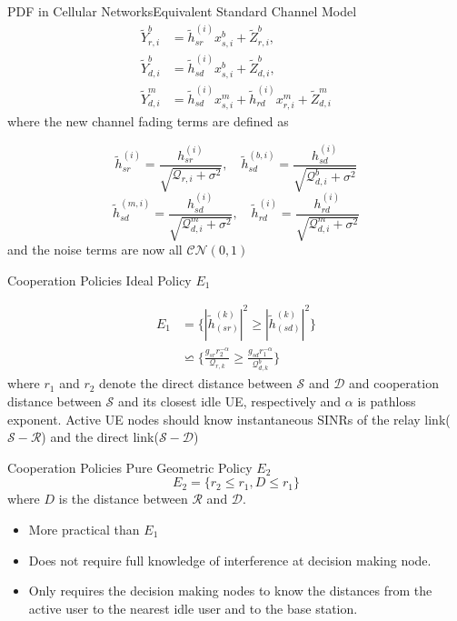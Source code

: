 \documentclass{beamer}
\begin{document}
\begin{frame}{PDF in Cellular Networks}{Equivalent Standard Channel Model}
\begin{align*}
\tilde{Y}_{r,i}^b &= \tilde{h}_{sr}^{(i)}x_{s,i}^b + \tilde{Z}_{r,i}^b, \\
\tilde{Y}_{d,i}^b &= \tilde{h}_{sd}^{(i)}x_{s,i}^b + \tilde{Z}_{d,i}^b, \\
\tilde{Y}_{d,i}^m &= \tilde{h}_{sd}^{(i)}x_{s,i}^m + \tilde{h}_{rd}^{(i)}x_{r,i}^m + \tilde{Z}_{d,i}^m
\end{align*}
where the new channel fading terms are defined as

\begin{equation*}
\tilde{h}_{sr}^{(i)} = \frac{h_{sr}^{(i)}}{\sqrt{\mathcal{Q}_{r,i} + \sigma^2}}, \quad \tilde{h}_{sd}^{(b,i)} = \frac{h_{sd}^{(i)}}{\sqrt{\mathcal{Q}_{d,i}^b + \sigma^2}} 
\end{equation*}
\begin{equation*}
\tilde{h}_{sd}^{(m,i)} = \frac{h_{sd}^{(i)}}{\sqrt{\mathcal{Q}_{d,i}^m + \sigma^2}},
\quad \tilde{h}_{rd}^{(i)} = \frac{h_{rd}^{(i)}}{\sqrt{\mathcal{Q}_{d,i}^m + \sigma^2}}
\end{equation*}
and the noise terms are now all $\mathcal{CN}(0,1)$
\end{frame}




\begin{frame}{Cooperation Policies} {Ideal Policy $E_1$ }

\begin{align*}
E_1 &= \Big\{|\tilde{h}_{(sr)}^{(k)}|^2 \geq |\tilde{h}_{(sd)}^{(k)}|^2\Big\} \\
&\backsimeq \Big\{ \frac{g_{sr}r_2^{-\alpha}}{\mathcal{Q}_{r,k}} \geq \frac{g_{sd}r_1^{-\alpha}}{\mathcal{Q}_{d,k}^b} \Big\}
\end{align*}
where $r_1$ and $r_2$ denote the direct distance
between $\mathcal{S}$ and $\mathcal{D}$ and cooperation distance between $\mathcal{S}$ and its closest idle UE, respectively and $\alpha$ is pathloss exponent.
Active UE nodes should know instantaneous  SINRs of the relay link($\mathcal{S}-\mathcal{R}$) and the
direct link($\mathcal{S}-\mathcal{D}$)
\end{frame}

\begin{frame}{Cooperation Policies} {Pure Geometric Policy $E_2$}
\vspace{-1cm}
\begin{equation*}
E_2 = \{r_2\leq r_1, D \leq r_1 \}
\end{equation*}
where $D$ is the distance between $\mathcal{R}$ and $\mathcal{D}$.
\vspace{1cm}
\pause
\begin{itemize}
\item More practical than $E_1$ 
\pause
\item Does not require full knowledge of interference at decision making node. 
\pause
\item Only requires the decision making nodes to know the distances
from the active user to the nearest idle user and to the base
station. 
\end{itemize}
\end{frame}
\end{document}
